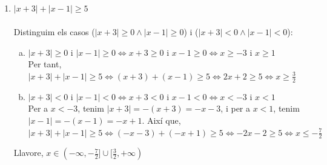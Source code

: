 \begin{enumerate}[3)]
\item $|x+3|+|x-1|\geq 5$ \\ \\
Distinguim els casos ($|x+3|\geq 0 \land |x-1|\geq 0$) i ($|x+3|<0\land |x-1|<0$): 
\begin{enumerate}[a)]
\item $|x+3|\geq 0$ i $|x-1|\geq 0\Longleftrightarrow x+3\geq 0$ i $x-1\geq 0\Longleftrightarrow x\geq -3$ i $x\geq 1$ \\
Per tant, $|x+3|+|x-1|\geq 5\Longleftrightarrow (x+3)+(x-1)\geq 5\Longleftrightarrow 2x+2\geq 5\Longleftrightarrow x\geq \frac{3}{2}$
\item $|x+3|<0$ i $|x-1|<0\Longleftrightarrow x+3<0$ i $x-1<0\Longleftrightarrow x<-3$ i $x<1$ \\
Per a $x<-3$, tenim $|x+3|=-(x+3)=-x-3$, i per a $x<1$, tenim $|x-1|=-(x-1)=-x+1$. Així que, $|x+3|+|x-1|\geq 5\Longleftrightarrow (-x-3)+(-x+1)\geq 5\Longleftrightarrow -2x-2\geq 5\Longleftrightarrow x\leq -\frac{7}{2}$
\end{enumerate}
Llavore, $x\in (-\infty,-\frac{7}{2}]\cup [\frac{3}{2},+\infty)$ \\
\end{enumerate}